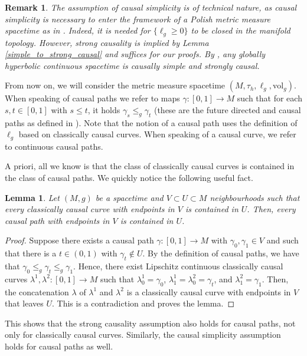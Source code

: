 \documentclass[a4paper,10pt]{article}
\newtheorem{lemma}[theorem]{Lemma}
\newtheorem{remark}[theorem]{Remark}
\numberwithin{equation}{section}
\newcommand{\vol}{\mathrm{vol}}
\begin{document}
\begin{remark}\label{remark_causal_simplicity}
    The assumption of causal simplicity is of technical nature, as causal simplicity is necessary to enter the framework of a Polish metric measure spacetime as in \cite{beran2024nonlinear}. Indeed, it is needed for $\{\ell_g \geq 0\}$ to be closed in the manifold topology. However, strong causality is implied by Lemma \ref{simple_to_strong_causal} and suffices for our proofs. By \cite[Proposition 3.3]{samann2016global}, any globally hyperbolic continuous spacetime is causally simple and strongly causal.
\end{remark}
From now on, we will consider the metric measure spacetime $(M, \tau_h, \ell_g, \vol_g)$.  When speaking of causal paths we refer to maps $\gamma:[0,1] \to M$ such that for each $s, t \in [0,1]$ with $s \leq t$, it holds $\gamma_s \leq_g \gamma_t$ (these are the future directed and causal paths as defined in \cite{beran2024nonlinear}). Note that the notion of a causal path uses the definition of $\ell_g$ based on classically causal curves. When speaking of a causal curve, we refer to continuous causal paths.
\smallskip


A priori, all we know is that the class of classically causal curves is contained in the class of causal paths. We quickly notice the following useful fact.
\smallskip

\begin{lemma}
    Let $(M, g)$  be a spacetime and $V \subset U \subset M$ neighbourhoods such that every classically causal curve with endpoints in $V$ is contained in $U$. Then, every causal path with endpoints in $V$ is contained in $U$.
\end{lemma}
\begin{proof}
    Suppose there exists a causal path $\gamma\colon [0,1] \to M$ with $\gamma_0, \gamma_1 \in V$ and such that there is a $t \in (0,1)$ with $\gamma_t \notin U$. By the definition of causal paths, we have that $\gamma_0 \leq_g \gamma_t \leq_g \gamma_1$. Hence, there exist Lipschitz continuous classically causal curves $\lambda^1, \lambda^2\colon [0,1] \to M$ such that $\lambda^1_0 = \gamma_0$, $\lambda^1_1=\lambda^2_0 = \gamma_t$, and $\lambda^2_1 = \gamma_1$. Then, the concatenation $\lambda$ of $\lambda^1$ and $\lambda^2$ is a classically causal curve with endpoints in $V$ that leaves $U$. This is a contradiction and proves the lemma. 
\end{proof}

This shows that the strong causality assumption also holds for causal paths, not only for classically causal curves. Similarly, the causal simplicity assumption holds for causal paths as well. 
\smallskip
\end{document}
